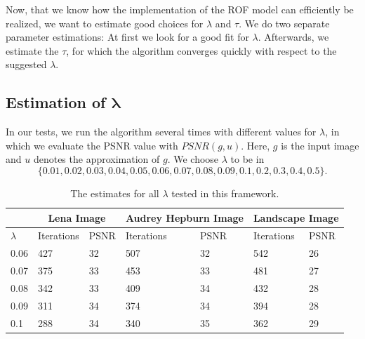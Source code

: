 \documentclass[abstracton]{scrreprt}
\begin{document}
                Now, that we know how the implementation of the ROF model can efficiently be realized, we want to estimate good choices for $\lambda$ and $\tau$. We do two separate parameter estimations: At first we look for a good fit for $\lambda$. Afterwards, we estimate the $\tau$, for which the algorithm converges quickly with respect to the suggested $\lambda$.

        \subsection{Estimation of $\boldsymbol{\lambda}$}
        \label{sub:estimation_of_lambda_rof}

            In our tests, we run the algorithm several times with different values for $\lambda$, in which we evaluate the PSNR value with $PSNR(g, u)$. Here, $g$ is the input image and $u$ denotes the approximation of $g$. We choose $\lambda$ to be in
                $$
                    \{ 0.01, 0.02, 0.03, 0.04, 0.05, 0.06, 0.07, 0.08, 0.09, 0.1, 0.2, 0.3, 0.4, 0.5 \}.
                $$
            \begin{table}[!ht]
                \centering
                \begin{tabular}{| l | l | l | l | l | l | l |}
                    \hline
                    & \multicolumn{2}{|c|}{Lena Image} & \multicolumn{2}{|c|}{Audrey Hepburn Image} & \multicolumn{2}{|c|}{Landscape Image} \\ \hline\hline 
                    $\lambda$ & Iterations & PSNR & Iterations & PSNR & Iterations & PSNR \\ \hline\hline
                    0.06 & 427 & 32 & 507 & 32 & 542 & 26 \\ \hline
                    0.07 & 375 & 33 & 453 & 33 & 481 & 27 \\ \hline
                    0.08 & 342 & 33 & 409 & 34 & 432 & 28 \\ \hline
                    0.09 & 311 & 34 & 374 & 34 & 394 & 28 \\ \hline
                    0.1 & 288 & 34 & 340 & 35 & 362 & 29 \\ \hline
                \end{tabular}
                \caption[Overview of values for $\lambda$ in the ROF model.]{The estimates for all $\lambda$ tested in this framework.}
                \label{tab:estimation_of_lambda_rof}
            \end{table}
\end{document}
